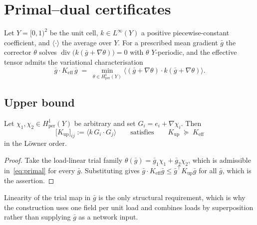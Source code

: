 
\section{Primal--dual certificates}
\label{sec:primaldual}

Let $Y = [0,1)^2$ be the unit cell, $k \in L^\infty(Y)$ a positive
piecewise-constant coefficient, and $\langle \cdot \rangle$ the average over
$Y$. For a prescribed mean gradient $\bar g$ the corrector $\theta$ solves
$\operatorname{div}\!\big(k(\bar g + \nabla\theta)\big) = 0$ with $\theta$
$Y$-periodic, and the effective tensor admits the variational
characterisation~\cite{Milton2002}
%
\begin{equation}
  \bar g \cdot K_{\mathrm{eff}}\, \bar g
  \;=\; \min_{\theta \in H^1_{\mathrm{per}}(Y)}
  \big\langle (\bar g + \nabla\theta) \cdot k (\bar g + \nabla\theta) \big\rangle .
  \label{eq:primal}
\end{equation}

\subsection{Upper bound}

\begin{theorem}
\label{thm:primal}
Let $\chi_1,\chi_2 \in H^1_{\mathrm{per}}(Y)$ be arbitrary and set
$G_i = e_i + \nabla \chi_i$. Then
%
\begin{equation}
  \big[K_{\mathrm{up}}\big]_{ij} := \big\langle k\, G_i \cdot G_j \big\rangle
  \qquad \text{satisfies} \qquad
  K_{\mathrm{up}} \;\succeq\; K_{\mathrm{eff}}
  \label{eq:Kup}
\end{equation}
%
in the L\"owner order.
\end{theorem}

\begin{proof}
Take the load-linear trial family
$\theta(\bar g) = \bar g_1 \chi_1 + \bar g_2 \chi_2$, which is admissible
in~\eqref{eq:primal} for every $\bar g$. Substituting gives
$\bar g \cdot K_{\mathrm{eff}} \bar g \le \bar g^{\!\top} K_{\mathrm{up}} \bar g$
for all $\bar g$, which is the assertion.
\end{proof}
Linearity of the trial map in $\bar g$ is the only structural requirement,
which is why the construction uses one field per unit load and combines
loads by superposition rather than supplying $\bar g$ as a network input.

